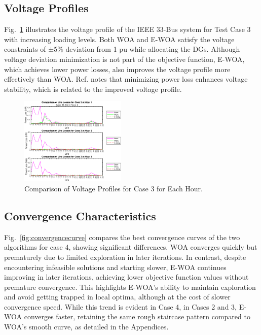 \documentclass[conference]{IEEEtran}
\begin{document}


\subsection{Voltage Profiles}

Fig.~\ref{fig:voltageprofile} illustrates the voltage profile of the IEEE 33-Bus system for Test Case 3 with increasing loading levels. Both WOA and E-WOA satisfy the voltage constraints of ±5\% deviation from 1 pu while allocating the DGs. Although voltage deviation minimization is not part of the objective function, E-WOA, which achieves lower power losses, also improves the voltage profile more effectively than WOA. Ref. \cite{kashem} notes that minimizing power loss enhances voltage stability, which is related to the improved voltage profile.




\begin{figure}[htbp]
	\centerline{\includegraphics[width=0.45\textwidth]{voltageprofile.png}}
	\vspace{-5pt}
	\caption{Comparison of Voltage Profiles for Case 3 for Each Hour.}
	\label{fig:voltageprofile}
\end{figure}

\vspace{-10pt}
\subsection{Convergence Characteristics}

Fig.~\ref{fig:convergencecurve} compares the best convergence curves of the two algorithms for case 4, showing significant differences. WOA converges quickly but prematurely due to limited exploration in later iterations. In contrast, despite encountering infeasible solutions and starting slower, E-WOA continues improving in later iterations, achieving lower objective function values without premature convergence. This highlights E-WOA's ability to maintain exploration and avoid getting trapped in local optima, although at the cost of slower convergence speed. While this trend is evident in Case 4, in Cases 2 and 3, E-WOA converges faster, retaining the same rough staircase pattern compared to WOA's smooth curve, as detailed in the Appendices.
\end{document}
